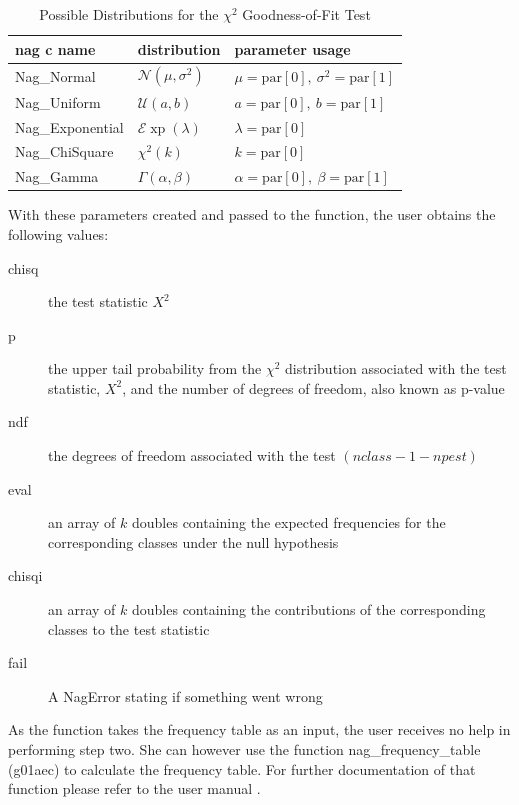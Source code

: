 \documentclass{article}
\theoremstyle{definition}
\begin{document}
\begin{table}[htbp]
\center
\caption{Possible Distributions for the $\chi^2$ Goodness-of-Fit Test}
\label{tbl:chisq_distributions}
\begin{tabular}{lll}
nag c name & distribution & parameter usage \\
\hline
Nag\_Normal & $\mathcal{N}(\mu,\sigma^2)$ & $\mu=\text{par}[0],~\sigma^2=\text{par}[1]$  \\
Nag\_Uniform & $\mathcal{U}(a,b)$ & $a=\text{par}[0],~b=\text{par}[1]$ \\
Nag\_Exponential & $\mathcal{E}\operatorname{xp}(\lambda)$ & $\lambda=\text{par}[0]$ \\
Nag\_ChiSquare & $\chi^2(k)$ & $k=\text{par}[0]$ \\
Nag\_Gamma & $\Gamma(\alpha,\beta)$ & $\alpha=\text{par}[0],~\beta=\text{par}[1]$
\end{tabular}
\end{table}
With these parameters created and passed to the function, the user obtains the following values:
\begin{description}
	\item[chisq] the test statistic $X^2$
	\item[p] the upper tail probability from the $\chi^2$ distribution associated with the test statistic, $X^2$, and the number of degrees of freedom, also known as p-value
	\item[ndf] the degrees of freedom associated with the test $(nclass-1-npest)$
	\item[eval] an array of $k$ doubles containing the expected frequencies for the corresponding classes under the null hypothesis
	\item[chisqi] an array of $k$ doubles containing the contributions of the corresponding classes to the test statistic
	\item[fail] A NagError stating if something went wrong
\end{description}
As the function takes the frequency table as an input, the user receives no help in performing step two.
She can however use the function nag\_frequency\_table (g01aec) to calculate the frequency table.
For further documentation of that function please refer to the user manual \cite{nagc}.
\end{document}
